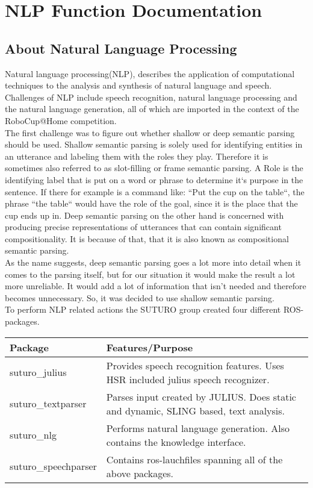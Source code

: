 \documentclass[main.tex]{subfiles}
\begin{document}
\renewcommand{\cleardoublepage}{}   
\renewcommand{\clearpage}{}
\newpage

\chapter{NLP Function Documentation}


\section{About Natural Language Processing}
    Natural language processing(NLP), describes the application of computational techniques to the analysis and synthesis of natural language and speech. Challenges of NLP include speech recognition, natural language processing and the natural language generation, all of which are imported in the context of the RoboCup@Home competition.\\ 
    The first challenge was to figure out whether shallow or deep semantic parsing should be used. Shallow semantic parsing is solely used for identifying entities in an utterance and labeling them with the roles they play. Therefore it is sometimes also referred to as slot-filling or frame semantic parsing. A Role is the identifying label that is put on a word or phrase to determine it‘s purpose in the sentence. If there for example is a command like: “Put the cup on the table“, the phrase “the table“ would have the role of the goal, since it is the place that the cup ends up in.
Deep semantic parsing on the other hand is concerned with producing precise representations of utterances that can contain significant compositionality. It is because of that, that it is also known as compositional semantic parsing.\\ 
  As the name suggests, deep semantic parsing goes a lot more into detail when it comes to the parsing itself, but for our situation it would make the result a lot more unreliable. It would add a lot of information that isn't needed and therefore becomes unnecessary. So, it was decided to use shallow semantic parsing.\\
    
    To perform NLP related actions the SUTURO group created four different ROS-packages.

    \begin{tabular}{|l|p{9cm}|}
        \hline
        \textbf{Package} & \textbf{Features/Purpose} \\
        \hline
        suturo\_julius & Provides speech recognition features. Uses HSR included julius speech recognizer. \\
        \hline 
        suturo\_textparser & Parses input created by JULIUS. Does static and dynamic, SLING based, text analysis. \\
        \hline
        suturo\_nlg & Performs natural language generation. Also contains the knowledge interface. \\
        \hline 
        suturo\_speechparser & Contains ros-lauchfiles spanning all of the above packages.\\
        \hline
    \end{tabular}
\end{document}
